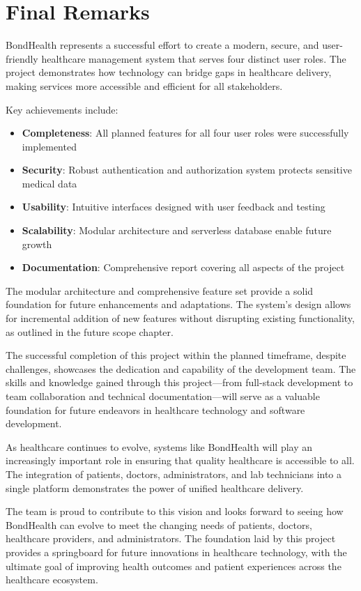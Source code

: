 \section{Final Remarks}
BondHealth represents a successful effort to create a modern, secure, and user-friendly healthcare management system that serves four distinct user roles. The project demonstrates how technology can bridge gaps in healthcare delivery, making services more accessible and efficient for all stakeholders.

Key achievements include:

\begin{itemize}
    \item \textbf{Completeness}: All planned features for all four user roles were successfully implemented
    \item \textbf{Security}: Robust authentication and authorization system protects sensitive medical data
    \item \textbf{Usability}: Intuitive interfaces designed with user feedback and testing
    \item \textbf{Scalability}: Modular architecture and serverless database enable future growth
    \item \textbf{Documentation}: Comprehensive report covering all aspects of the project
\end{itemize}

The modular architecture and comprehensive feature set provide a solid foundation for future enhancements and adaptations. The system's design allows for incremental addition of new features without disrupting existing functionality, as outlined in the future scope chapter.

The successful completion of this project within the planned timeframe, despite challenges, showcases the dedication and capability of the development team. The skills and knowledge gained through this project—from full-stack development to team collaboration and technical documentation—will serve as a valuable foundation for future endeavors in healthcare technology and software development.

As healthcare continues to evolve, systems like BondHealth will play an increasingly important role in ensuring that quality healthcare is accessible to all. The integration of patients, doctors, administrators, and lab technicians into a single platform demonstrates the power of unified healthcare delivery.

The team is proud to contribute to this vision and looks forward to seeing how BondHealth can evolve to meet the changing needs of patients, doctors, healthcare providers, and administrators. The foundation laid by this project provides a springboard for future innovations in healthcare technology, with the ultimate goal of improving health outcomes and patient experiences across the healthcare ecosystem.

